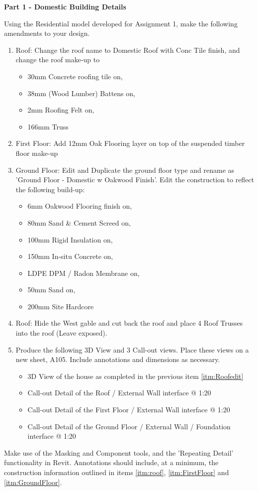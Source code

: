 \begin{flushleft}
	\large\textbf{Part 1 - Domestic Building Details}\\
\end{flushleft}
Using the Residential model developed for Assignment 1, make the following amendments to your design.
\begin{enumerate}
	\item\label{itm:roof} Roof: Change the roof name to Domestic Roof with Conc Tile finish, and change the roof make-up to 
	\begin{itemize}
		\item 30mm Concrete roofing tile on,
		\item 38mm (Wood Lumber) Battens on,
		\item 2mm Roofing Felt on,
		\item 166mm Truss
	\end{itemize}
	\item\label{itm:FirstFloor} First Floor: Add 12mm Oak Flooring layer on top of the suspended timber floor make-up
	\item\label{itm:GroundFloor} Ground Floor: Edit and Duplicate the ground floor type and rename as 'Ground Floor - Domestic w Oakwood Finish'.  Edit the construction to reflect the following build-up:
	\begin{itemize}
		\item 6mm Oakwood Flooring finish on,
		\item 80mm Sand \& Cement Screed on,
		\item 100mm Rigid Insulation on,
		\item 150mm In-situ Concrete on,
		\item LDPE DPM / Radon Membrane on,
		\item 50mm Sand on,
		\item 200mm Site Hardcore
	\end{itemize}
	\item\label{itm:Roofedit} Roof: Hide the West gable and cut back the roof and place 4 Roof Trusses into the roof (Leave exposed).
	\item Produce the following 3D View and 3 Call-out views. Place these views on a new sheet, A105.  Include annotations and dimensions as necessary.
	\begin{itemize}
		\item 3D View of the house as completed in the previous item \ref{itm:Roofedit} 
		\item Call-out Detail of the Roof / External Wall interface @ 1:20
		\item Call-out Detail of the First Floor / External Wall interface @ 1:20
		\item Call-out Detail of the Ground Floor / External Wall / Foundation interface @ 1:20
	\end{itemize}
\end{enumerate}
Make use of the Masking and Component tools, and the 'Repeating Detail' functionality in Revit.  Annotations should include, at a minimum, the construction information outlined in items \ref{itm:roof}, \ref{itm:FirstFloor} and \ref{itm:GroundFloor}. 






